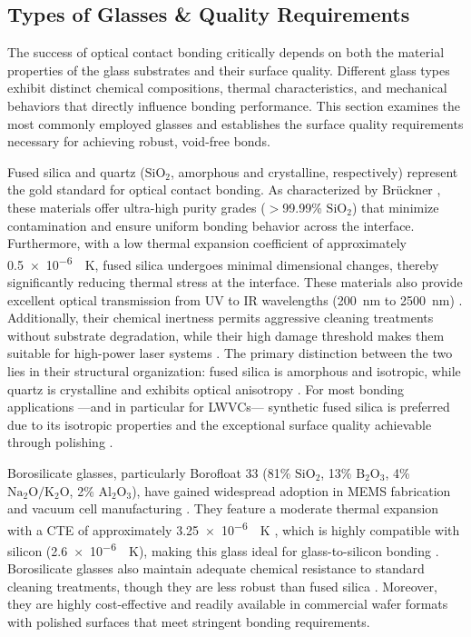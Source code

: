 \subsection{Types of Glasses \& Quality Requirements}
The success of optical contact bonding critically depends on both the material 
properties of the glass substrates and their surface quality. Different glass 
types exhibit distinct chemical compositions, thermal characteristics, and 
mechanical behaviors that directly influence bonding performance. This section 
examines the most commonly employed glasses and establishes the surface quality 
requirements necessary for achieving robust, void-free bonds.

Fused silica and quartz ($\mathrm{SiO_2}$, amorphous and crystalline, respectively) 
represent the gold standard for optical contact bonding. As characterized by 
Brückner \cite{brueckner1970}, these materials offer ultra-high purity grades 
($>$99.99\% $\mathrm{SiO_2}$) that minimize contamination and ensure uniform 
bonding behavior across the interface. Furthermore, with a low thermal expansion 
coefficient of approximately \SI{0.5e-6}{\per\kelvin}, fused silica undergoes 
minimal dimensional changes, thereby significantly reducing thermal stress at the 
interface. These materials also provide excellent optical transmission from UV to IR 
wavelengths (\SI{200}{\nano\meter} to \SI{2500}{\nano\meter}) \cite{malitson1965}. 
Additionally, their chemical inertness permits aggressive cleaning treatments without 
substrate degradation, while their high damage threshold makes them suitable for 
high-power laser systems \cite{ye2016}. The primary distinction between the two 
lies in their structural organization: fused silica is amorphous and isotropic, 
while quartz is crystalline and exhibits optical anisotropy \cite{brueckner1970}. 
For most bonding applications ---and in particular for LWVCs--- synthetic fused silica is 
preferred due to its isotropic properties and the exceptional surface quality 
achievable through polishing \cite{meissner2002}.

Borosilicate glasses, particularly Borofloat 33 (81\% $\mathrm{SiO_2}$, 
13\% $\mathrm{B_2O_3}$, 4\% $\mathrm{Na_2O/K_2O}$, 2\% $\mathrm{Al_2O_3}$), have gained 
widespread adoption in MEMS fabrication and vacuum cell manufacturing 
\cite{schott_borofloat, possl1999}. They feature a moderate thermal expansion 
with a CTE of approximately \SI{3.25e-6}{\per\kelvin} \cite{okada1984}, which is highly 
compatible with silicon (\SI{2.6e-6}{\per\kelvin}), making this glass ideal for 
glass-to-silicon bonding \cite{gosele2006}. Borosilicate glasses also maintain 
adequate chemical resistance to standard cleaning treatments, though they are less 
robust than fused silica \cite{schott_borofloat}. Moreover, they are highly 
cost-effective and readily available in commercial wafer formats with polished surfaces 
that meet stringent bonding requirements.

